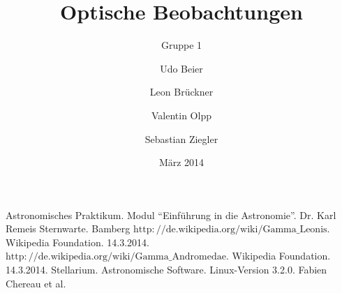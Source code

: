 
%
%


\title{Optische Beobachtungen}
\subtitle{Gruppe 1}
\date{März 2014}
\author{Udo Beier \and Leon Brückner \and Valentin Olpp \and Sebastian Ziegler}

\maketitle
\tableofcontents
\newpage
\listoffigures
\listoftables
\newpage







%
\newpage

%


\begin{thebibliography}{9}
 Astronomisches Praktikum. Modul \enquote{Einführung in die Astronomie}. Dr. Karl Remeis Sternwarte. Bamberg
 $\mathrm{http://de.wikipedia.org/wiki/Gamma\_Leonis.}$ Wikipedia Foundation. 14.3.2014.
 $\mathrm{http://de.wikipedia.org/wiki/Gamma\_Andromedae}$. Wikipedia Foundation. 14.3.2014.
 Stellarium. Astronomische Software. Linux-Version 3.2.0. Fabien Chereau et al.
\end{thebibliography}



